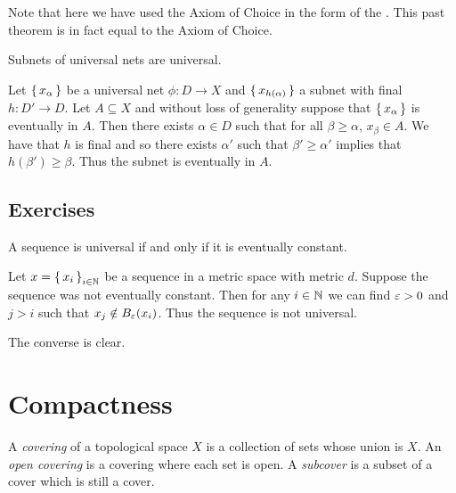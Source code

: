 \documentclass[letterpaper, 11pt]{article}
\begin{document}
Note that here we have used the Axiom of Choice in the form of the .
This past theorem is in fact equal to the Axiom of Choice.

\begin{prop}
  Subnets of universal nets are universal.
\end{prop}
\begin{pf}
  Let $\set{x_{\alpha}}$ be a universal net $\phi\colon D \to X$ and $\set{x_{h(\alpha)}}$ a subnet with final $h\colon D' \to D$.
  Let $A \subseteq X$ and without loss of generality suppose that $\set{x_{\alpha}}$ is eventually in $A$.
  Then there exists $\alpha \in D$ such that for all $\beta \geq \alpha$, $x_{\beta} \in A$.
  We have that $h$ is final and so there exists $\alpha'$ such that $\beta' \geq \alpha'$ implies that $h(\beta') \geq \beta$.
  Thus the subnet is eventually in $A$.
\end{pf}

\clearpage

\subsection*{Exercises}

\begin{exercise}
  A sequence is universal if and only if it is eventually constant.
\end{exercise}
\begin{pf}
  Let $x = \set{x_{i}}_{i \in \mathbb{N}}$ be a sequence in a metric space with metric $d$.
  Suppose the sequence was not eventually constant.
  Then for any $i \in \mathbb{N}$ we can find $\varepsilon > 0$ and $j > i$ such that $x_{j} \notin B_{\varepsilon}(x_{i})$.
  Thus the sequence is not universal.

  The converse is clear.
\end{pf}

\clearpage

\section{Compactness}

\begin{defn}
  A \emph{covering} of a topological space $X$ is a collection of sets whose union is $X$.
  An \emph{open covering} is a covering where each set is open.
  A \emph{subcover} is a subset of a cover which is still a cover.
\end{defn}
\end{document}
